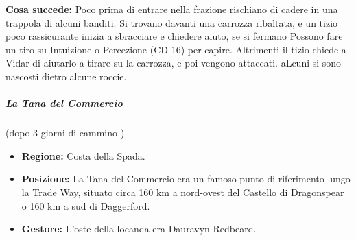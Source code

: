 \documentclass{article}
\begin{document}
                \textbf{Cosa succede: } Poco prima di entrare nella frazione rischiano di cadere in una trappola di alcuni banditi. Si trovano davanti una carrozza ribaltata, e un tizio poco rassicurante inizia a sbracciare e chiedere aiuto, se si fermano Possono fare un tiro su Intuizione o Percezione (CD 16) per capire. Altrimenti il tizio chiede a Vidar di aiutarlo a tirare su la carrozza, e poi vengono attaccati. aLcuni si sono nascosti dietro alcune roccie.  
                \\
            \subparagraph{La Tana del Commercio} (dopo 3 giorni di cammino )
                \begin{itemize}
                    \item \textbf{Regione:} Costa della Spada.
                    \item \textbf{Posizione:} La Tana del Commercio era un famoso punto di riferimento lungo la Trade Way, situato circa 160 km a nord-ovest del Castello di Dragonspear o 160 km a sud di Daggerford.
                
                
                    \item \textbf{Gestore:} L'oste della locanda era Dauravyn Redbeard.
                        

\end{itemize}
\end{document}
